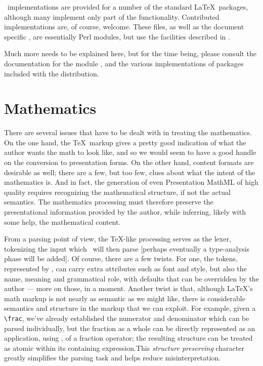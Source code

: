 \documentclass{book}
\begin{document}
\LaTeXML\ implementations are provided for a number of the standard \LaTeX\ packages,
although many implement only part of the functionality.  Contributed implementations are,
of course, welcome.  These files, as well as the document specific ,
are essentially Perl modules, but use the facilities described in .

Much more needs to be explained here, but for the time being,
please consult the documentation for the module , and
the various implementations of packages included with the distribution.

\chapter{Mathematics}\label{math}
There are several issues that have to be dealt with in treating the mathematics.
On the one hand, the \TeX\ markup gives a pretty good indication of what the
author wants the math to look like, and so we would seem to have a good handle
on the conversion to presentation forms.  On the other hand, content formats
are desirable as well; there are a few, but too few, clues about what the
intent of the mathematics is.  And in fact, the generation of even Presentation
MathML of high quality requires recognizing the mathematical structure, if not
the actual semantics. The mathematics processing must therefore preserve the
presentational information provided by the author, while inferring, likely
with some help, the mathematical content.

From a parsing point of view, the \TeX-like processing serves as the lexer,
tokenizing the input which \LaTeXML\ will then parse
[perhaps eventually a type-analysis phase will be added].
Of course, there are a few twists.
For one, the tokens, represented by , can carry extra attributes
such as font and style, but also the name, meaning and grammatical role,
with defaults that can be overridden by the author --- more on those, in a moment.
Another twist is that, although \LaTeX's math markup is not nearly
as semantic as we might like, there is considerable semantics and structure in the 
markup that we can exploit. For example, given a \verb|\frac|, we've already
established the numerator and denominator which can be parsed individually,
but the fraction as a whole can be directly represented as an application,
using , of a fraction operator; the resulting structure can be treated
as atomic within its containing expression.This \emph{structure preserving} character
greatly simplifies the parsing task and helps reduce misinterpretation.
\end{document}
